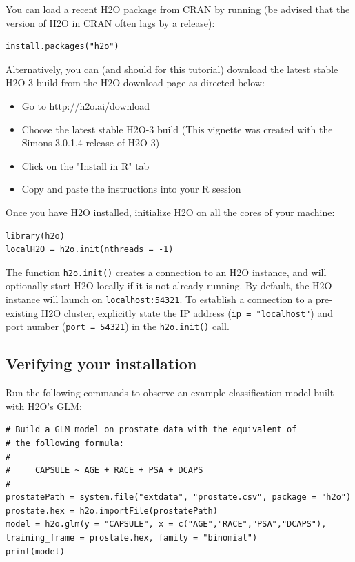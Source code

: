 \documentclass[11pt]{article}
\begin{document}
You can load a recent H2O package from CRAN by running (be advised that the version of H2O in CRAN often lags by a release):

\begin{lstlisting}[style=R]
install.packages("h2o")
\end{lstlisting}

Alternatively, you can (and should for this tutorial) download the latest stable H2O-3 build from the H2O download page as directed below:

\begin{itemize}
\item Go to http://h2o.ai/download
\item Choose the latest stable H2O-3 build (This vignette was created with the Simons 3.0.1.4 release of H2O-3)
\item Click on the "Install in R" tab
\item Copy and paste the instructions into your R session
\end{itemize}

\bigskip
Once you have H2O installed, initialize H2O on all the cores of your machine:

\begin{lstlisting}[style=R]
library(h2o)
localH2O = h2o.init(nthreads = -1)
\end{lstlisting}

The function \texttt{h2o.init()} creates a connection to an H2O instance, and will optionally start H2O locally if it is not already running. By default, the H2O instance will launch on \texttt{localhost:54321}. To establish a connection to a pre-existing H2O cluster, explicitly state the IP address (\texttt{ip = "localhost"}) and port number (\texttt{port = 54321}) in the \texttt{h2o.init()} call.

\subsection{Verifying your installation}
Run the following commands to observe an example classification model built with H2O's GLM:

\begin{lstlisting}[style=R]
# Build a GLM model on prostate data with the equivalent of
# the following formula:
#
#     CAPSULE ~ AGE + RACE + PSA + DCAPS
#
prostatePath = system.file("extdata", "prostate.csv", package = "h2o")
prostate.hex = h2o.importFile(prostatePath)
model = h2o.glm(y = "CAPSULE", x = c("AGE","RACE","PSA","DCAPS"), training_frame = prostate.hex, family = "binomial")
print(model)
\end{lstlisting}
\end{document}
